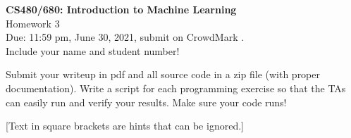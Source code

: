 \documentclass[10pt,letter,notitlepage]{article}
\newcommand{\red}[1]{{\color{red}#1}}
\newcounter{exercise}
\begin{document}
\begin{center}
\large{\textbf{CS480/680: Introduction to Machine Learning} \\ Homework 3\\ \red{Due: 11:59 pm, June 30, 2021}, submit on CrowdMark .} \\

Include your name and student number!

\end{center}

\begin{center}
Submit your writeup in pdf and all source code in a zip file (with proper documentation). Write a script for each programming exercise so that the TAs can easily run and verify your results. Make sure your code runs!

[Text in square brackets are hints that can be ignored.]
\end{center}
\end{document}
